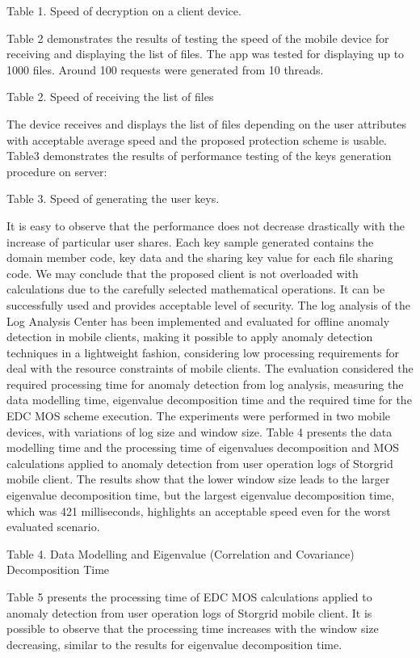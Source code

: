 \documentclass[twocolumn]{svjour3}          %
\begin{document}
Table 1. Speed of decryption on a client device.

Table 2 demonstrates the results of testing the speed of the mobile device for receiving and displaying the list of files. The app was tested for displaying up to 1000 files. Around 100 requests were generated from 10 threads.

Table 2. Speed of receiving the list of files

The device receives and displays the list of files depending on the user attributes with acceptable average speed and the proposed protection scheme is usable. Table3 demonstrates the results of performance testing of the keys generation procedure on server:

Table 3. Speed of generating the user keys.

It is easy to observe that the performance does not decrease drastically with the increase of particular user shares. Each key sample generated contains the domain member code, key data and the sharing key value for each file sharing code. We may conclude that the proposed client is not overloaded with calculations due to the carefully selected mathematical operations. It can be successfully used and provides acceptable level of security.
The log analysis of the Log Analysis Center has been implemented and evaluated for offline anomaly detection in mobile clients, making it possible to apply anomaly detection techniques in a lightweight fashion, considering low processing requirements for deal with the resource constraints of mobile clients. The evaluation considered the required processing time for anomaly detection from log analysis, measuring the data modelling time, eigenvalue decomposition time and the required time for the EDC MOS scheme execution. The experiments were performed in two mobile devices, with variations of log size and window size. 
Table 4 presents the data modelling time and the processing time of eigenvalues decomposition and MOS calculations applied to anomaly detection from user operation logs of Storgrid mobile client. The results show that the lower window size leads to the larger eigenvalue decomposition time, but the largest eigenvalue decomposition time, which was 421 milliseconds, highlights an acceptable speed even for the worst evaluated scenario.

Table 4. Data Modelling and Eigenvalue (Correlation and Covariance) Decomposition Time 

Table 5 presents the processing time of EDC MOS calculations applied to anomaly detection from user operation logs of Storgrid mobile client. It is possible to observe that the processing time increases with the window size decreasing, similar to the results for eigenvalue decomposition time. 
\end{document}
